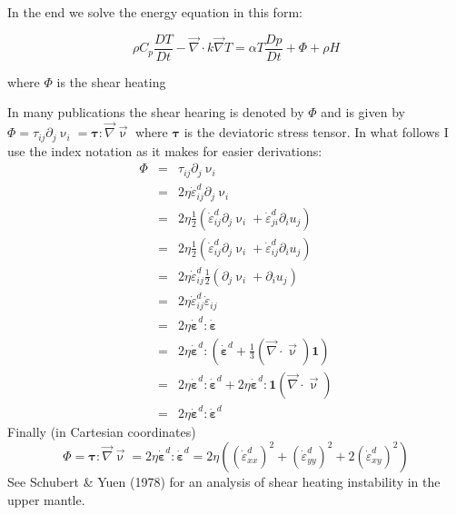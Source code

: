 In the end we solve the energy equation in this form:
\begin{mdframed}[backgroundcolor=blue!5]
\begin{equation}
\rho C_p \frac{DT}{Dt} - {\vec \nabla} \cdot k {\vec \nabla} T =  \alpha T \frac{Dp}{Dt} + \Phi + \rho H  
\end{equation}
\end{mdframed}
where $\Phi$ is the shear heating 


In many publications the shear hearing is denoted by $\Phi$ and is given by 
$\Phi=\tau_{ij}\partial_j \upnu_i={\bm \tau}:{\vec \nabla}{\vec \upnu}$ where 
${\bm \tau}$ is the deviatoric stress tensor.
In what follows I use the index notation as it makes for easier derivations:
\begin{eqnarray}
\Phi 
&=& \tau_{ij}\partial_j \upnu_i \nonumber\\
&=& 2 \eta \dot{\varepsilon}_{ij}^d\partial_j \upnu_i \nonumber\\
&=& 2 \eta \frac{1}{2}\left( \dot{\varepsilon}_{ij}^d\partial_j \upnu_i + \dot{\varepsilon}_{ji}^d\partial_i u_j \right) \nonumber\\
&=& 2 \eta \frac{1}{2}\left( \dot{\varepsilon}_{ij}^d\partial_j \upnu_i + \dot{\varepsilon}_{ij}^d\partial_i u_j \right) \nonumber\\
&=& 2 \eta  \dot{\varepsilon}_{ij}^d  \frac{1}{2}\left(\partial_j \upnu_i + \partial_i u_j \right) \nonumber\\
&=& 2 \eta  \dot{\varepsilon}_{ij}^d   \dot{\varepsilon}_{ij} \nonumber\\
&=& 2 \eta  \dot{\bm \varepsilon}^d :  \dot{\bm \varepsilon} \nonumber\\
&=& 2 \eta  \dot{\bm \varepsilon}^d : \left( \dot{\bm \varepsilon}^d +\frac{1}{3} ({\vec \nabla}\cdot{\vec \upnu}) {\bm 1} \right)\nonumber\\
&=& 2 \eta  \dot{\bm \varepsilon}^d : \dot{\bm \varepsilon}^d 
+ 2 \eta  \dot{\bm \varepsilon}^d : {\bm 1} ({\vec \nabla}\cdot{\vec \upnu}) \nonumber\\ 
&=& 2 \eta  \dot{\bm \varepsilon}^d : \dot{\bm \varepsilon}^d \label{eq:physicsshearheating} 
\end{eqnarray}
Finally (in Cartesian coordinates)
\begin{equation}
\Phi = {\bm \tau}:{\vec \nabla}{\vec \upnu} = 2 \eta  \dot{\bm \varepsilon}^d : \dot{\bm \varepsilon}^d
= 2 \eta \left( (\dot{\varepsilon}_{xx}^d)^2 + (\dot{\varepsilon}_{yy}^d)^2 + 2(\dot{\varepsilon}_{xy}^d)^2 \right) 
\end{equation}
See Schubert \& Yuen (1978) \cite{scyu78} for an analysis of shear heating instability in the upper mantle.

